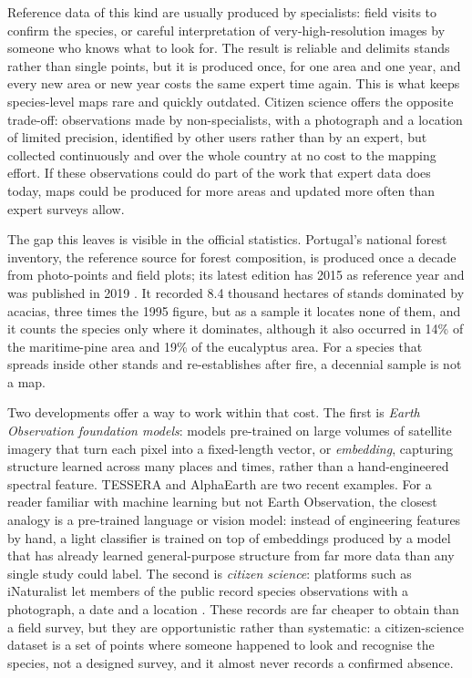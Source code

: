 Reference data of this kind are usually produced by specialists:
field visits to confirm the species, or careful interpretation of
very-high-resolution images by someone who knows what to look for.
The result is reliable and delimits stands rather than single points,
but it is produced once, for one area and one year, and every new area
or new year costs the same expert time again. This is what keeps
species-level maps rare and quickly outdated. Citizen science offers
the opposite trade-off: observations made by non-specialists, with a
photograph and a location of limited precision, identified by other
users rather than by an expert, but collected continuously and over
the whole country at no cost to the mapping effort. If these
observations could do part of the work that expert data does today,
maps could be produced for more areas and updated more often than
expert surveys allow.

The gap this leaves is visible in the official statistics. Portugal's
national forest inventory, the reference source for forest
composition, is produced once a decade from photo-points and field
plots; its latest edition has 2015 as reference year and was published
in 2019 \cite{icnf2019}. It recorded 8.4 thousand hectares of stands
dominated by acacias, three times the 1995 figure, but as a sample it
locates none of them, and it counts the species only where it
dominates, although it also occurred in 14\% of the maritime-pine
area and 19\% of the eucalyptus area. For a species that spreads
inside other stands and re-establishes after fire, a decennial sample
is not a map.

Two developments offer a way to work within that cost. The
first is \emph{Earth Observation foundation models}: models
pre-trained on large volumes of satellite imagery that turn each pixel
into a fixed-length vector, or \emph{embedding}, capturing structure
learned across many places and times, rather than a hand-engineered
spectral feature. TESSERA \cite{feng2025} and AlphaEarth
\cite{brown2025} are two recent examples. For a reader familiar with
machine learning but not Earth Observation, the closest analogy is a
pre-trained language or vision model: instead of engineering features
by hand, a light classifier is trained on top of embeddings produced
by a model that has already learned general-purpose structure from far
more data than any single study could label. The second is
\emph{citizen science}: platforms such as iNaturalist let members of
the public record species observations with a photograph, a date and a
location \cite{gillespie2024}. These records are far cheaper to obtain
than a field survey, but they are opportunistic rather than
systematic: a citizen-science dataset is a set of points where someone
happened to look and recognise the species, not a designed survey, and
it almost never records a confirmed absence.

